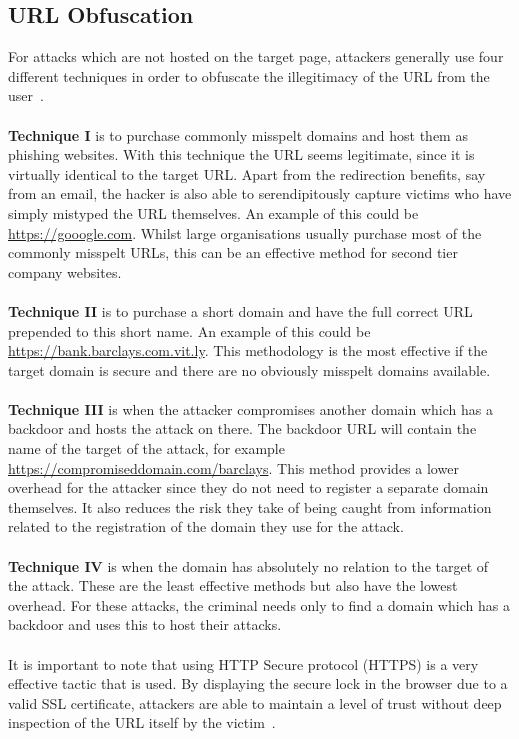 \documentclass[12pt,twoside]{report}
\begin{document}
\subsection{URL Obfuscation} \label{urlobfuscation}
For attacks which are not hosted on the target page, attackers generally use four different techniques in order to obfuscate the illegitimacy of the URL from the user~\cite{freephish}.
\\\\
\textbf{Technique I} is to purchase commonly misspelt domains and host them as phishing websites. With this technique the URL seems legitimate, since it is virtually identical to the target URL. Apart from the redirection benefits, say from an email, the hacker is also able to serendipitously capture victims who have simply mistyped the URL themselves. An example of this could be \url{https://gooogle.com}. Whilst large organisations usually purchase most of the commonly misspelt URLs, this can be an effective method for second tier company websites. 
\\\\
\textbf{Technique II} is to purchase a short domain and have the full correct URL prepended to this short name. An example of this could be \url{https://bank.barclays.com.vit.ly}. This methodology is the most effective if the target domain is secure and there are no obviously misspelt domains available.
\\\\
\textbf{Technique III} is when the attacker compromises another domain which has a backdoor and hosts the attack on there. The backdoor URL will contain the name of the target of the attack, for example \url{https://compromiseddomain.com/barclays}. This method provides a lower overhead for the attacker since they do not need to register a separate domain themselves. It also reduces the risk they take of being caught from information related to the registration of the domain they use for the attack.
\\\\
\textbf{Technique IV} is when the domain has absolutely no relation to the target of the attack. These are the least effective methods but also have the lowest overhead. For these attacks, the criminal needs only to find a domain which has a backdoor and uses this to host their attacks.
\\\\
It is important to note that using HTTP Secure protocol (HTTPS) is a very effective tactic that is used. By displaying the secure lock in the browser due to a valid SSL certificate, attackers are able to maintain a level of trust without deep inspection of the URL itself by the victim~\cite{https}.
\end{document}
